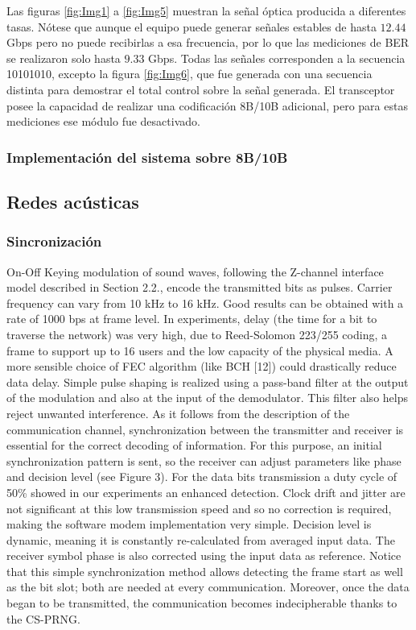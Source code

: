 \documentclass[12pt,twoside,openright]{moddalthesis}
\begin{document}
Las figuras \ref{fig:Img1} a \ref{fig:Img5} muestran la señal óptica producida a diferentes
tasas. Nótese que aunque el equipo puede generar señales estables de
hasta $12.44$ Gbps pero no puede recibirlas a esa frecuencia, por lo que las
mediciones de BER se realizaron solo hasta $9.33$ Gbps. Todas las señales
corresponden a la secuencia 10101010, excepto la figura \ref{fig:Img6},
que fue generada con una secuencia distinta para demostrar el total
control sobre la señal generada. El transceptor posee la capacidad de
realizar una codificación 8B/10B adicional, pero para estas mediciones
ese módulo fue desactivado.



\subsubsection{Implementación del sistema sobre 8B/10B}
\subsection{Redes acústicas}
\subsubsection{Sincronización}
On-Off Keying modulation of sound waves, following the Z-channel interface model described in Section 2.2., encode the transmitted bits as pulses. Carrier frequency can vary from 10 kHz to 16 kHz. Good results can be obtained with a rate of 1000 bps at frame level. In experiments, delay (the time for a bit to traverse the network) was very high, due to Reed-Solomon 223/255 coding, a frame to support up to 16 users and the low capacity of the physical media. A more sensible choice of FEC algorithm (like BCH [12]) could drastically reduce data delay. Simple pulse shaping is realized using a pass-band filter at the output of the modulation and also at the input of the demodulator. This filter also helps reject unwanted interference.
As it follows from the description of the communication channel, synchronization between the transmitter and receiver is essential for the correct decoding of information. For this purpose, an initial synchronization pattern is sent, so the receiver can adjust parameters like phase and decision level (see Figure 3). For the data bits transmission a duty cycle of 50\% showed in our experiments an enhanced detection. Clock drift and jitter are not significant at this low transmission speed and so no correction is required, making the software modem implementation very simple. Decision level is dynamic, meaning it is constantly re-calculated from averaged input data. The receiver symbol phase is also corrected using the input data as reference. Notice that this simple synchronization method allows detecting the frame start as well as the bit slot; both are needed at every communication. Moreover, once the data began to be transmitted, the communication becomes indecipherable thanks to the CS-PRNG.
\end{document}
